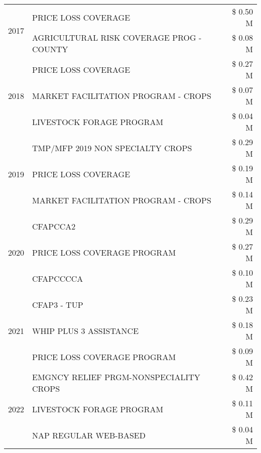 \begin{tabular}{llr}
\cline{1-3}
\multirow[t]{2}{*}{2017} & PRICE LOSS COVERAGE & \$ 0.50 M \\
 & AGRICULTURAL RISK COVERAGE PROG - COUNTY & \$ 0.08 M \\
\cline{1-3}
\multirow[t]{3}{*}{2018} & PRICE LOSS COVERAGE & \$ 0.27 M \\
 & MARKET FACILITATION PROGRAM - CROPS & \$ 0.07 M \\
 & LIVESTOCK FORAGE PROGRAM & \$ 0.04 M \\
\cline{1-3}
\multirow[t]{3}{*}{2019} & TMP/MFP 2019 NON SPECIALTY CROPS & \$ 0.29 M \\
 & PRICE LOSS COVERAGE & \$ 0.19 M \\
 & MARKET FACILITATION PROGRAM - CROPS & \$ 0.14 M \\
\cline{1-3}
\multirow[t]{3}{*}{2020} & CFAPCCA2 & \$ 0.29 M \\
 & PRICE LOSS COVERAGE PROGRAM & \$ 0.27 M \\
 & CFAPCCCCA & \$ 0.10 M \\
\cline{1-3}
\multirow[t]{3}{*}{2021} & CFAP3 - TUP & \$ 0.23 M \\
 & WHIP PLUS 3 ASSISTANCE & \$ 0.18 M \\
 & PRICE LOSS COVERAGE PROGRAM & \$ 0.09 M \\
\cline{1-3}
\multirow[t]{3}{*}{2022} & EMGNCY RELIEF PRGM-NONSPECIALITY CROPS & \$ 0.42 M \\
 & LIVESTOCK FORAGE PROGRAM & \$ 0.11 M \\
 & NAP REGULAR WEB-BASED & \$ 0.04 M \\
\cline{1-3}
\bottomrule
\end{tabular}

